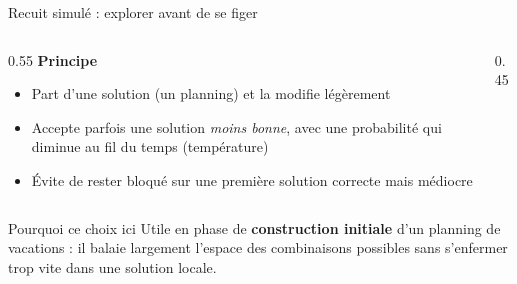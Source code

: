 \begin{frame}{Recuit simulé : explorer avant de se figer}
  \begin{columns}
    \begin{column}{0.55\textwidth}
      \textbf{Principe}
      \begin{itemize}
        \item Part d'une solution (un planning) et la modifie légèrement
        \item Accepte parfois une solution \textit{moins bonne}, avec une
        probabilité qui diminue au fil du temps (température)
        \item Évite de rester bloqué sur une première solution correcte mais
        médiocre
      \end{itemize}
    \end{column}
    \begin{column}{0.45\textwidth}
      \centering
    \end{column}
  \end{columns}
  \begin{block}{Pourquoi ce choix ici}
    Utile en phase de \textbf{construction initiale} d'un planning de
    vacations : il balaie largement l'espace des combinaisons possibles sans
    s'enfermer trop vite dans une solution locale.
  \end{block}
\end{frame}

